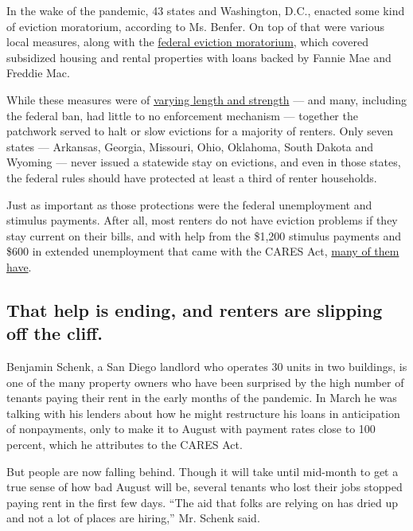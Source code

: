 In the wake of the pandemic, 43 states and Washington, D.C., enacted
some kind of eviction moratorium, according to Ms. Benfer. On top of
that were various local measures, along with the
\href{https://nlihc.org/federal-moratoriums}{federal eviction
moratorium}, which covered subsidized housing and rental properties with
loans backed by Fannie Mae and Freddie Mac.

While these measures were of
\href{https://evictionlab.org/covid-policy-scorecard/\#scorecard-app}{varying
length and strength} --- and many, including the federal ban, had little
to no enforcement mechanism --- together the patchwork served to halt or
slow evictions for a majority of renters. Only seven states ---
Arkansas, Georgia, Missouri, Ohio, Oklahoma, South Dakota and Wyoming
--- never issued a statewide stay on evictions, and even in those
states, the federal rules should have protected at least a third of
renter households.

Just as important as those protections were the federal unemployment and
stimulus payments. After all, most renters do not have eviction problems
if they stay current on their bills, and with help from the \$1,200
stimulus payments and \$600 in extended unemployment that came with the
CARES Act,
\href{https://www.nmhc.org/research-insight/nmhc-rent-payment-tracker/}{many
of them have}.

\hypertarget{that-help-is-ending-and-renters-are-slipping-off-the-cliff}{%
\subsection{That help is ending, and renters are slipping off the
cliff.}\label{that-help-is-ending-and-renters-are-slipping-off-the-cliff}}

Benjamin Schenk, a San Diego landlord who operates 30 units in two
buildings, is one of the many property owners who have been surprised by
the high number of tenants paying their rent in the early months of the
pandemic. In March he was talking with his lenders about how he might
restructure his loans in anticipation of nonpayments, only to make it to
August with payment rates close to 100 percent, which he attributes to
the CARES Act.

But people are now falling behind. Though it will take until mid-month
to get a true sense of how bad August will be, several tenants who lost
their jobs stopped paying rent in the first few days. ``The aid that
folks are relying on has dried up and not a lot of places are hiring,''
Mr. Schenk said.

